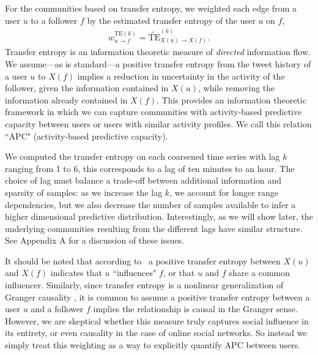  For the communities based on transfer entropy, we weighted each edge from a user $u$ to a follower $f$ by the estimated transfer entropy of the user $u$ on $f$, 
\begin{align}
	w_{u \to f}^{\text{TE}(k)} = \widetilde{\text{TE}}_{X(u) \to X(f)}^{(k)}. \label{Eqn-EW-activity}
\end{align}
Transfer entropy is an information theoretic measure of \emph{directed} information flow. We assume---as is standard---a positive transfer entropy from the tweet history of a user $u$ to $X(f)$ implies a reduction in uncertainty in the activity of the follower, given the information contained in $X(u)$, while removing the information already contained in $X(f)$. This provides an information theoretic framework in which we can capture communities with activity-based predictive capacity between users or users with similar activity profiles. We call this relation ``APC" (activity-based predictive capacity). 

 We computed the transfer entropy on each coarsened time series with lag $k$ ranging from 1 to 6, this corresponds to a lag of ten minutes to an hour. The choice of lag must balance a trade-off between additional information and sparsity of samples: as we increase the lag $k$, we account for longer range dependencies, but we also decrease the number of samples available to infer a higher dimensional predictive distribution.  Interestingly, as we will show later, the underlying communities resulting from the different lags have similar structure.  See Appendix A for a discussion of these issues.

 

It should be noted that according to~\cite{ver2012information} a positive transfer entropy between $X(u)$ and $X(f)$  indicates that $u$ ``influences" $f$, or that $u$ and $f$ share a common influencer. Similarly, since transfer entropy is a nonlinear generalization of Granger causality \cite{granger1963economic}, it is common to assume a positive transfer entropy between a user $u$ and a follower $f$ implies the relationship is causal in the Granger sense. However, we are skeptical whether this measure truly captures social influence in its entirety, or even causality in the case of online social networks. So instead we simply treat this weighting as a way to explicitly quantify APC between users.

